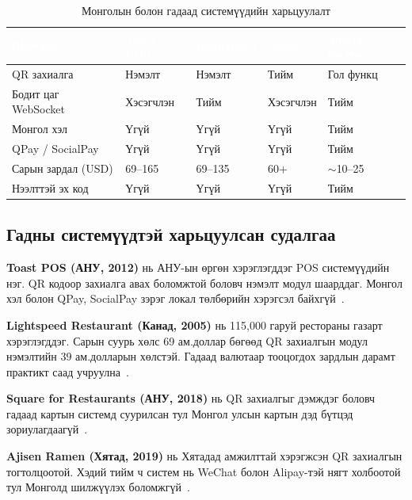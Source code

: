 \begin{table}[htbp]
\caption{Монголын болон гадаад системүүдийн харьцуулалт}
\label{tab:compare}
\centering
\footnotesize
\begin{tabularx}{\textwidth}{|L|Y|Y|Y|Y|}
\hline
{}
\textcolor{white}{\textbf{Шалгуур}} &
\textcolor{white}{\textbf{Toast POS}} &
\textcolor{white}{\textbf{Lightspeed}} &
\textcolor{white}{\textbf{Square}} &
\textcolor{white}{\textbf{Энэхүү систем}} \\ \hline
QR захиалга & Нэмэлт & Нэмэлт & Тийм & Гол функц \\ \hline
{}
Бодит цаг WebSocket & Хэсэгчлэн & Тийм & Хэсэгчлэн & Тийм \\ \hline
Монгол хэл & Үгүй & Үгүй & Үгүй & Тийм \\ \hline
{}
QPay / SocialPay & Үгүй & Үгүй & Үгүй & Тийм \\ \hline
Сарын зардал (USD) & 69--165 & 69--135 & 60+ & $\sim$10--25 \\ \hline
{}
Нээлттэй эх код & Үгүй & Үгүй & Үгүй & Тийм \\ \hline
\end{tabularx}
\end{table}

\subsection{Гадны системүүдтэй харьцуулсан судалгаа}

\textbf{Toast POS (АНУ, 2012)} нь АНУ-ын өргөн хэрэглэгддэг POS системүүдийн нэг.
QR кодоор захиалга авах боломжтой боловч нэмэлт модул шаарддаг. Монгол хэл болон
QPay, SocialPay зэрэг локал төлбөрийн хэрэгсэл байхгүй~\cite{toast2023}.

\textbf{Lightspeed Restaurant (Канад, 2005)} нь 115,000 гаруй рестораны газарт
хэрэглэгддэг. Сарын суурь хөлс 69 ам.доллар бөгөөд QR захиалгын модул нэмэлтийн
39 ам.долларын хөлстэй. Гадаад валютаар тооцогдох зардлын дарамт практикт
саад учруулна~\cite{lightspeed2023}.

\textbf{Square for Restaurants (АНУ, 2018)} нь QR захиалгыг дэмждэг боловч гадаад
картын системд суурилсан тул Монгол улсын картын дэд бүтцэд зориулагдаагүй~\cite{square2023}.

\textbf{Ajisen Ramen (Хятад, 2019)} нь Хятадад амжилттай хэрэгжсэн QR захиалгын
тогтолцоотой. Хэдий тийм ч систем нь WeChat болон Alipay-тэй нягт холбоотой тул
Монголд шилжүүлэх боломжгүй~\cite{ajisen2020}.

